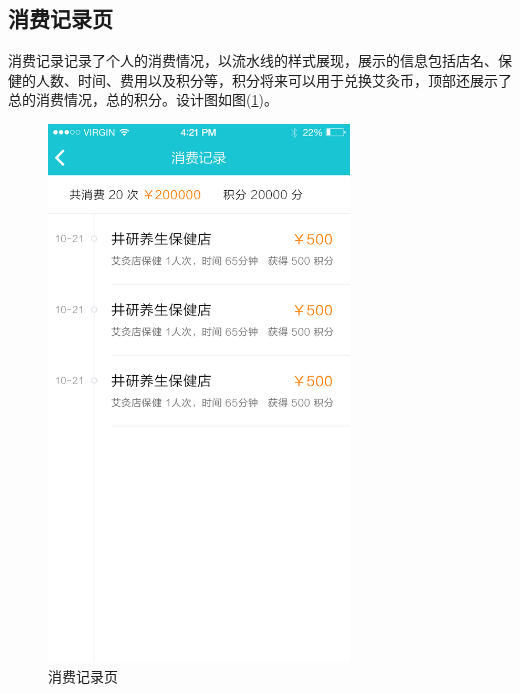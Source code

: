     \subsection{消费记录页}
      \label{subsec:消费记录页}
        消费记录记录了个人的消费情况，以流水线的样式展现，展示的信息包括店名、保健的人数、时间、费用以及积分等，积分将来可以用于兑换艾灸币，顶部还展示了总的消费情况，总的积分。设计图如图(\ref{fig:record_dsn})。
        \begin{figure}[htbp]
          \centering
          \includegraphics[width=8cm]{./img/record_dsn.png}
          \caption{消费记录页}
          \label{fig:record_dsn}
        \end{figure}

